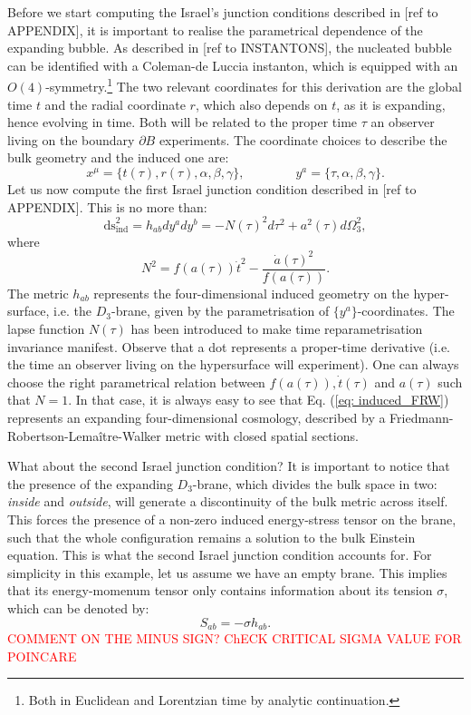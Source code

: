 Before we start computing the Israel's junction conditions described in [ref to APPENDIX], it is important to realise the parametrical dependence of the expanding bubble. As described in [ref to INSTANTONS], the nucleated bubble can be identified with a Coleman-de Luccia instanton, which is equipped with an $O(4)$-symmetry.\footnote{Both in Euclidean and Lorentzian time by analytic continuation.} The two relevant coordinates for this derivation are the global time $t$ and the radial coordinate $r$, which also depends on $t$, as it is expanding, hence evolving in time. Both will be related to the proper time $\tau$ an observer living on the boundary $\partial B$ experiments. The coordinate choices to describe the bulk geometry and the induced one are:
\begin{equation}\label{eq: coordinates}
	x^{\mu} = \{t(\tau), r(\tau), \alpha, \beta, \gamma \}, \qquad \qquad  y^{a} = \{\tau, \alpha, \beta, \gamma\}.
\end{equation}
Let us now compute the first Israel junction condition described in [ref to APPENDIX]. This is no more than:
\begin{equation}\label{eq: induced_FRW}
	\text{ds}^{2}_{\text{ind}} = h_{ab} dy^{a} dy^{b} =  -N(\tau)^{2}d\tau^{2} + a^{2}(\tau) d\Omega_{3}^{2},
\end{equation}
where
\begin{equation}\label{eq: lapse_func}
	N^{2} = f(a(\tau)) \dot{t}^{2} - \frac{\dot{a}(\tau)^{2}}{f(a(\tau))}.
\end{equation}
The metric $h_{ab}$ represents the four-dimensional induced geometry on the hyper-surface, i.e. the $D_{3}$-brane, given by the parametrisation of $\{y^{a}\}$-coordinates. The lapse function $N(\tau)$ has been introduced to make time reparametrisation invariance manifest. Observe that a dot represents a proper-time derivative (i.e. the time an observer living on the hypersurface will experiment). One can always choose the right parametrical relation between $f(a(\tau)), \dot{t}(\tau)$ and $a(\tau)$ such that $N=1$. In that case, it is always easy to see that Eq. (\ref{eq: induced_FRW}) represents an expanding four-dimensional cosmology, described by a Friedmann-Robertson-Lemaître-Walker metric with closed spatial sections. 

What about the second Israel junction condition? It is important to notice that the presence of the expanding $D_{3}$-brane, which divides the bulk space in two: \textit{inside} and \textit{outside}, will generate a discontinuity of the bulk metric across itself. This forces the presence of a non-zero induced energy-stress tensor on the brane, such that the whole configuration remains a solution to the bulk Einstein equation. This is what the second Israel junction condition accounts for. For simplicity in this example, let us assume we have an empty brane. This implies that its energy-momenum tensor only contains information about its tension $\sigma$, which can be denoted by:
\begin{equation}\label{eq: simple_second_junc}
	S_{ab} = - \sigma h_{ab}.
\end{equation}
\textcolor{red}{COMMENT ON THE MINUS SIGN? ChECK CRITICAL SIGMA VALUE FOR POINCARE}

